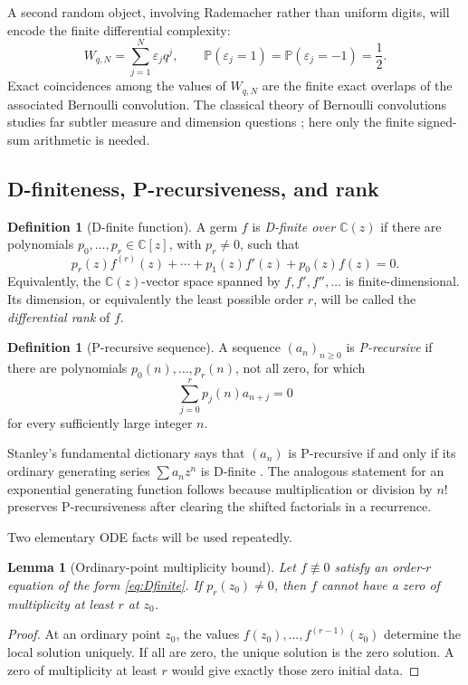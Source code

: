 \documentclass[11pt]{article}
\numberwithin{equation}{section}
\newtheorem{lemma}[theorem]{Lemma}
\theoremstyle{definition}
\newtheorem{definition}[theorem]{Definition}
\theoremstyle{remark}
\newcommand{\C}{\mathbb C}
\newcommand{\Prob}{\mathbb P}
\newcommand{\eps}{\varepsilon}
\begin{document}
A second random object, involving Rademacher rather than uniform digits, will
encode the finite differential complexity:
\begin{equation}
 W_{q,N}=\sum_{j=1}^{N}\eps_jq^j,
 \qquad \Prob(\eps_j=1)=\Prob(\eps_j=-1)=\frac12.
 \label{eq:rademacher-sum}
\end{equation}
Exact coincidences among the values of $W_{q,N}$ are the finite exact overlaps
of the associated Bernoulli convolution.  The classical theory of Bernoulli
convolutions studies far subtler measure and dimension questions
\cite{Solomyak,Hochman}; here only the finite signed-sum arithmetic is needed.

\subsection{D-finiteness, P-recursiveness, and rank}

\begin{definition}[D-finite function]
A germ $f$ is \emph{D-finite over $\C(z)$} if there are polynomials
$p_0,\ldots,p_r\in\C[z]$, with $p_r\ne0$, such that
\begin{equation}
 p_r(z)f^{(r)}(z)+\cdots+p_1(z)f'(z)+p_0(z)f(z)=0.
 \label{eq:Dfinite}
\end{equation}
Equivalently, the $\C(z)$-vector space spanned by
$f,f',f'',\ldots$ is finite-dimensional.  Its dimension, or equivalently the
least possible order $r$, will be called the \emph{differential rank} of $f$.
\end{definition}

\begin{definition}[P-recursive sequence]
A sequence $(a_n)_{n\ge0}$ is \emph{P-recursive} if there are polynomials
$p_0(n),\ldots,p_r(n)$, not all zero, for which
\begin{equation}
 \sum_{j=0}^{r}p_j(n)a_{n+j}=0
 \label{eq:Precursive}
\end{equation}
for every sufficiently large integer $n$.
\end{definition}

Stanley's fundamental dictionary says that $(a_n)$ is P-recursive if and only
if its ordinary generating series $\sum a_nz^n$ is D-finite
\cite{StanleyDfinite}.  The analogous statement for an exponential generating
function follows because multiplication or division by $n!$ preserves
P-recursiveness after clearing the shifted factorials in a recurrence.

Two elementary ODE facts will be used repeatedly.
\begin{lemma}[Ordinary-point multiplicity bound]
\label{lem:zero-multiplicity}
Let $f\not\equiv0$ satisfy an order-$r$ equation of the form
\eqref{eq:Dfinite}.  If $p_r(z_0)\ne0$, then $f$ cannot have a zero of
multiplicity at least $r$ at $z_0$.
\end{lemma}
\begin{proof}
At an ordinary point $z_0$, the values
$f(z_0),\ldots,f^{(r-1)}(z_0)$ determine the local solution uniquely.  If all
are zero, the unique solution is the zero solution.  A zero of multiplicity at
least $r$ would give exactly those zero initial data.
\end{proof}
\end{document}
